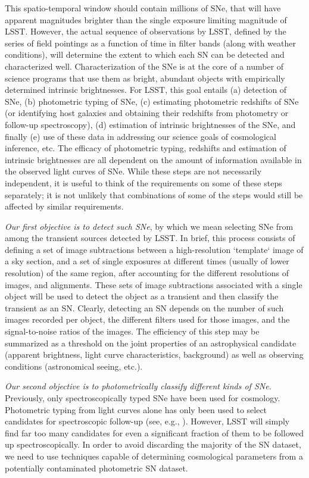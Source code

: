 This spatio-temporal window should contain millions  of SNe, that will have apparent magnitudes brighter than the single exposure limiting magnitude of LSST.  However, the actual
 sequence of observations by LSST, defined by the series of field pointings as a
 function of time in filter bands (along with weather conditions), will
 determine the extent to which each SN can be detected and
 characterized well.  Characterization of the SNe is at the core of a
 number of science programs that use them as bright, abundant objects with empirically determined intrinsic brightnesses. For LSST, this goal entails (a) detection of SNe, (b) photometric typing of SNe, (c) estimating photometric redshifts of SNe (or identifying host galaxies 
 and obtaining their redshifts from photometry or follow-up spectroscopy),
(d) estimation of intrinsic brightnesses of the SNe, and finally (e) use of these data in addressing our science goals of cosmological inference, etc.
The efficacy of photometric typing, redshifts and estimation of intrinsic brightnesses are all
dependent on the amount of information available in the observed light curves of SNe. While these steps are not necessarily independent, it is useful to think of the requirements on some of these steps separately; it is not unlikely  that combinations of some of the steps would still be affected by similar requirements. 

{\emph{Our first objective is to detect such SNe}}, by which we mean
selecting SNe from among the transient sources detected by LSST.
In brief, this process 
consists of defining a set of image subtractions between a high-resolution
`template` image of a sky section, and a set of single exposures at
different times (usually of lower resolution) of the same region, after 
accounting for the different resolutions of images, and alignments. These sets of image subtractions associated
 with a single object will be used to detect the object as a transient and then
classify the transient as an SN. Clearly, detecting an SN depends on the number of such images recorded per object, the different filters used for those images, and the signal-to-noise ratios of the images. %
The efficiency of this step may be summarized as a threshold on the joint properties 
of an astrophysical candidate (apparent brightness, light curve characteristics, background) as well as observing conditions (astronomical seeing, etc.).  

{\emph{Our second objective is to photometrically classify different kinds of SNe.}} 
Previously, only spectroscopically typed SNe have been used for cosmology. Photometric 
typing from light curves alone has only been used to select candidates for spectroscopic 
follow-up (see, e.g., \citet{Sako2008}). However, LSST will simply find far too many 
candidates for even a significant fraction of them to be followed up spectroscopically. In order to avoid 
discarding the majority of the SN dataset, we need to use techniques capable of 
determining cosmological parameters from a potentially contaminated photometric SN dataset.


